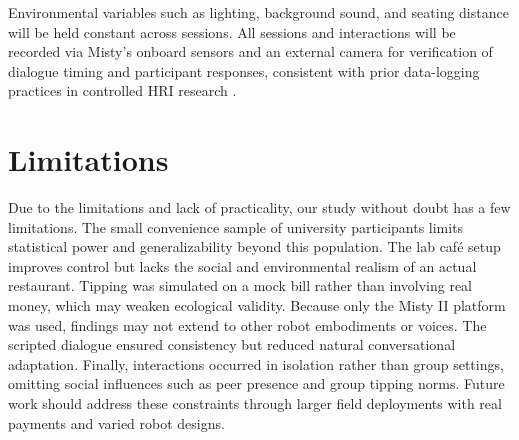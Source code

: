 \documentclass[conference]{IEEEtran}
\begin{document}
Environmental variables such as lighting, background sound, and seating distance will be held constant across sessions. All sessions and interactions will be recorded via Misty's onboard sensors and an external camera for verification of dialogue timing and participant responses, consistent with prior data-logging practices in controlled HRI research \cite{b26}.

\section{Limitations}
\label{sec:limitations}
Due to the limitations and lack of practicality, our study without doubt has a few limitations. The small convenience sample of university participants limits statistical power and generalizability beyond this population. The lab café setup improves control but lacks the social and environmental realism of an actual restaurant. Tipping was simulated on a mock bill rather than involving real money, which may weaken ecological validity. Because only the Misty II platform was used, findings may not extend to other robot embodiments or voices. The scripted dialogue ensured consistency but reduced natural conversational adaptation. Finally, interactions occurred in isolation rather than group settings, omitting social influences such as peer presence and group tipping norms. Future work should address these constraints through larger field deployments with real payments and varied robot designs.
\end{document}
